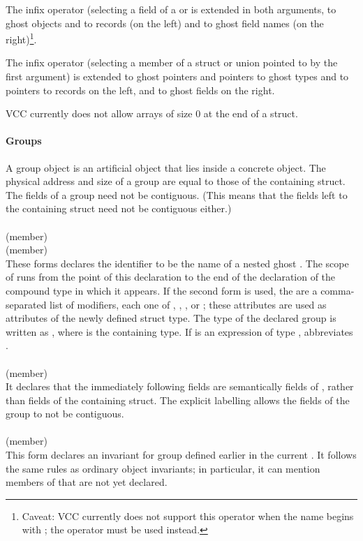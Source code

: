 \documentclass[preprint,nocopyrightspace]{sigplanconf}
\newcommand{\subsubsubsection}[1]{\paragraph{#1}}
\begin{document}
{{{{The infix  operator (selecting a field of a 
or  is extended in both arguments, to ghost objects and to
records (on the left) and to ghost field names (on the right)\footnote{
Caveat: VCC currently does not support this operator when the name begins
with \vcc{\ }; the \vcc{->} operator must be used instead.}.


The infix \vcc{->} operator (selecting a member of a struct or union
pointed to by the first argument) is extended to ghost pointers and
pointers to ghost types and to pointers to records on the left, and to
ghost fields on the right.

VCC currently does not allow arrays of size 0 at the end of a struct.

\subsubsubsection{Groups}
A group object is an artificial object that lies inside a
concrete  object. The physical address and size of a group
are equal to those of the containing struct. The fields of a group
need not be contiguous. (This means that the fields left to the
containing struct need not be contiguous either.)
\\\\
\noindent{} (member)\\
 (member)\\
These forms declares the identifier  to be the name of a nested
ghost . The scope of  runs from the point of this
declaration to the end of the declaration of the compound type in
which it appears.
If the second form is used,
the  are a comma-separated list of modifiers,
each one of , , ,
or ; these attributes are used as attributes of the
newly defined struct type.
The type of the declared group is written as , where 
is the containing  type. If  is an expression of
type ,  abbreviates .
\\\\
 (member)\\
It declares that the immediately
following fields are semantically fields of , rather than fields of
the containing struct. The explicit labelling allows the fields of the
group to not be contiguous.
\\\\
 (member)\\
This form declares an invariant for group  defined earlier in
the current . It follows the same rules as ordinary object
invariants; in particular, it can mention members of  that are
not yet declared.

}}}}
\end{document}

